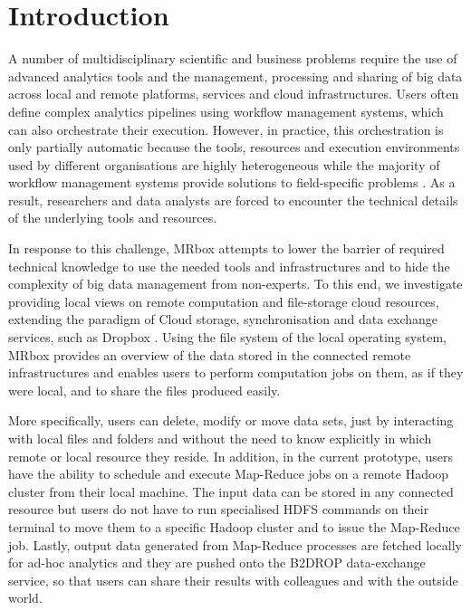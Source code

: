 \section{Introduction}
A number of multidisciplinary scientific and business problems require the use of advanced analytics tools and the management, processing and sharing of big data across local and remote platforms, services and cloud infrastructures. Users often define complex analytics pipelines using workflow management systems, which can also orchestrate their execution. However, in practice, this orchestration is only partially automatic because the tools, resources and execution environments used by different organisations are highly heterogeneous while the majority of workflow management systems provide solutions to field-specific problems \cite{khan2019big}. As a result, researchers and data analysts are forced to encounter the technical details of the underlying tools and resources.

In response to this challenge, MRbox attempts to lower the barrier of required technical knowledge to use the needed tools and infrastructures and to hide the complexity of big data management from non-experts. To this end, we investigate providing local views on remote computation and file-storage cloud resources, extending the paradigm of Cloud storage, synchronisation and data exchange services, such as Dropbox \cite{dropbox}. Using the file system of the local operating system, MRbox provides an overview of the data stored in the connected remote infrastructures and enables users to perform computation jobs on them, as if they were local, and to share the files produced easily. 

More specifically, users can delete, modify or move data sets, just by interacting with local files and folders and without the need to know explicitly in which remote or local resource they reside. In addition, in the current prototype, users have the ability to schedule and execute Map-Reduce jobs \cite{dean2008mapreduce} on a remote Hadoop cluster \cite{shvachko2010hadoop} from their local machine. The input data can be stored in any connected resource but users do not have to run specialised HDFS commands \cite{shvachko2010hadoop} on their terminal to move them to a specific Hadoop cluster and to issue the Map-Reduce job. Lastly, output data generated from Map-Reduce processes are fetched locally for ad-hoc analytics and they are pushed onto the B2DROP data-exchange service\cite{b2drop}, so that users can share their results with colleagues and with the outside world. 

